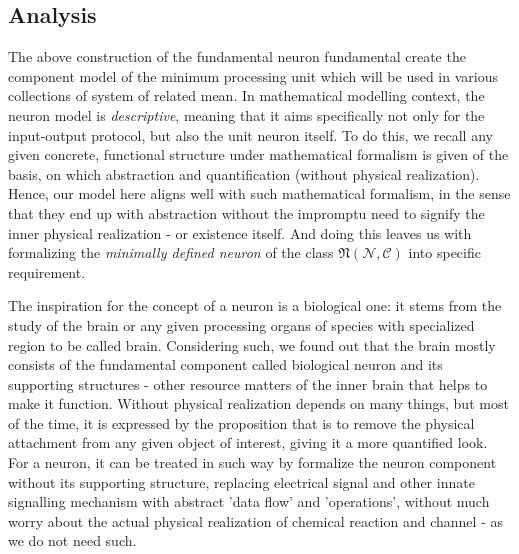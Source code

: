 \subsection{Analysis}
The above construction of the fundamental neuron fundamental create the component model of the minimum processing unit which will be used in various collections of system of related mean. In mathematical modelling context, the neuron model is \textit{descriptive}, meaning that it aims specifically not only for the input-output protocol, but also the unit neuron itself. To do this, we recall any given concrete, functional structure under mathematical formalism is given of the basis, on which abstraction and quantification (without physical realization). Hence, our model here aligns well with such mathematical formalism, in the sense that they end up with abstraction without the impromptu need to signify the inner physical realization - or existence itself. And doing this leaves us with formalizing the \textit{minimally defined neuron} of the class $\mathfrak{N}(\mathcal{N},\mathcal{C})$ into specific requirement. 

The inspiration for the concept of a neuron is a biological one: it stems from the study of the brain or any given processing organs of species with specialized region to be called brain. Considering such, we found out that the brain mostly consists of the fundamental component called biological neuron and its supporting structures - other resource matters of the inner brain that helps to make it function. Without physical realization depends on many things, but most of the time, it is expressed by the proposition that is to remove the physical attachment from any given object of interest, giving it a more quantified look. For a neuron, it can be treated in such way by formalize the neuron component without its supporting structure, replacing electrical signal and other innate signalling mechanism with abstract 'data flow' and 'operations', without much worry about the actual physical realization of chemical reaction and channel - as we do not need such. 

